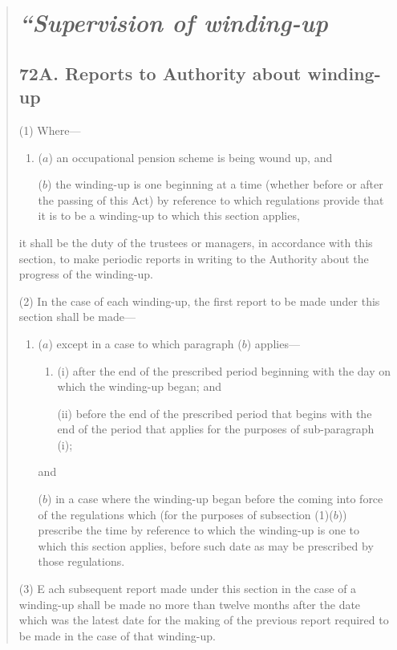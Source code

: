 \documentclass[12pt,a4paper]{article}
\begin{document}
\begin{quotation}
\section*{\itshape “Supervision of winding-up}

\subsection*{72A. Reports to Authority about winding-up}

(1) Where—
\begin{enumerate}\item[]
($a$) an occupational pension scheme is being wound up, and

($b$) the winding-up is one beginning at a time (whether before or after the passing of this Act) by reference to which regulations provide that it is to be a winding-up to which this section applies,
\end{enumerate}
it shall be the duty of the trustees or managers, in accordance with this section, to make periodic reports in writing to the Authority about the progress of the winding-up.

(2) In the case of each winding-up, the first report to be made under this section shall be made—
\begin{enumerate}\item[]
($a$) except in a case to which paragraph ($b$)  applies—
\begin{enumerate}\item[]
(i) after the end of the prescribed period beginning with the day on which the winding-up began; and

(ii) before the end of the prescribed period that begins with the end of the period that applies for the purposes of sub-paragraph (i);
\end{enumerate}
and

($b$) in a case where the winding-up began before the coming into force of the regulations which (for the purposes of subsection (1)($b$)) prescribe the time by reference to which the winding-up is one to which this section applies, before such date as may be prescribed by those regulations.
\end{enumerate}

(3) E%
ach subsequent report made under this section in the case of a winding-up shall be made no more than twelve months after the date which 
was the latest date for the making of the previous report required to be made in the case of that winding-up.


\end{quotation}
\end{document}
